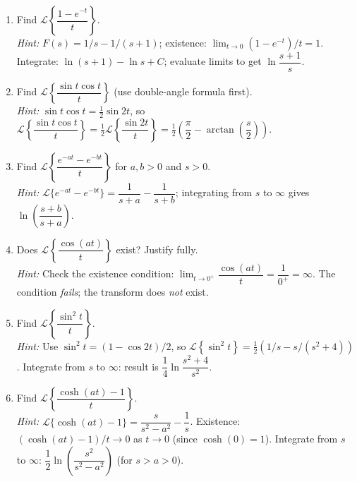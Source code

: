 \documentclass[12pt,a4paper]{article}
\begin{document}
\begin{enumerate}[leftmargin=2em, label=\textbf{P\arabic*.}]

\item Find $\mathcal{L}\!\left\{\dfrac{1-e^{-t}}{t}\right\}$.\\
  \textit{Hint:} $F(s)=1/s - 1/(s+1)$; existence: $\lim_{t\to 0}(1-e^{-t})/t=1$.
  Integrate: $\ln(s+1) - \ln s + C$; evaluate limits to get $\ln\dfrac{s+1}{s}$.

\item Find $\mathcal{L}\!\left\{\dfrac{\sin t\cos t}{t}\right\}$ (use double-angle formula first).\\
  \textit{Hint:} $\sin t\cos t = \frac{1}{2}\sin 2t$, so
  $\mathcal{L}\!\left\{\dfrac{\sin t\cos t}{t}\right\}
   = \frac{1}{2}\mathcal{L}\!\left\{\dfrac{\sin 2t}{t}\right\}
   = \frac{1}{2}\!\left(\dfrac{\pi}{2}-\arctan\!\left(\dfrac{s}{2}\right)\right)$.

\item Find $\mathcal{L}\!\left\{\dfrac{e^{-at}-e^{-bt}}{t}\right\}$ for $a,b>0$ and $s>0$.\\
  \textit{Hint:} $\mathcal{L}\{e^{-at}-e^{-bt}\} = \dfrac{1}{s+a} - \dfrac{1}{s+b}$;
  integrating from $s$ to $\infty$ gives $\ln\!\left(\dfrac{s+b}{s+a}\right)$.

\item Does $\mathcal{L}\!\left\{\dfrac{\cos(at)}{t}\right\}$ exist? Justify fully.\\
  \textit{Hint:} Check the existence condition:
  $\lim_{t\to 0^+}\dfrac{\cos(at)}{t} = \dfrac{1}{0^+} = \infty$.
  The condition \emph{fails}; the transform does \emph{not} exist.

\item Find $\mathcal{L}\!\left\{\dfrac{\sin^2 t}{t}\right\}$.\\
  \textit{Hint:} Use $\sin^2 t = (1-\cos 2t)/2$, so
  $\mathcal{L}\!\left\{\sin^2 t\right\} = \frac{1}{2}(1/s - s/(s^2+4))$.
  Integrate from $s$ to $\infty$: result is $\dfrac{1}{4}\ln\dfrac{s^2+4}{s^2}$.

\item Find $\mathcal{L}\!\left\{\dfrac{\cosh(at)-1}{t}\right\}$.\\
  \textit{Hint:} $\mathcal{L}\{\cosh(at)-1\} = \dfrac{s}{s^2-a^2} - \dfrac{1}{s}$.
  Existence: $(\cosh(at)-1)/t \to 0$ as $t\to 0$ (since $\cosh(0)=1$).
  Integrate from $s$ to $\infty$: $\dfrac{1}{2}\ln\!\left(\dfrac{s^2}{s^2-a^2}\right)$ (for $s>a>0$).

\end{enumerate}
\end{document}

